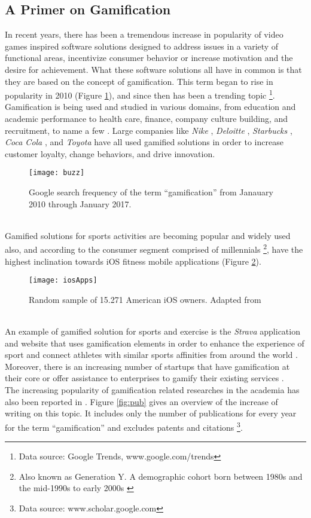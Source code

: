 \subsection{A Primer on Gamification}
In recent years, there has been a tremendous increase in popularity of video games inspired software solutions designed to address issues in a variety of functional areas, incentivize consumer behavior or increase motivation and the desire for achievement. What these software solutions all have in common is that they are based on the concept of gamification. This term began to rise in popularity in 2010 (Figure \ref{fig:buzz}), and since then has been a trending topic \footnote{Data source: Google Trends, www.google.com/trends}. Gamification is being used and studied in various domains, from education and academic performance to health care, finance, company culture building, and recruitment, to name a few \cite{gamificationExamples, gamificationWiki, enterpriseGamify}. Large companies like \textit{Nike} \cite{nikePlus}, \textit{Deloitte} \cite{deloitte}, \textit{Starbucks} \cite{starbucks}, \textit{Coca Cola} \cite{coke}, and \textit{Toyota} \cite{toyota} have all used gamified solutions in order to increase customer loyalty, change behaviors, and drive innovation. \pagebreak 
\begin{figure}[h]
    \centering
    \texttt{[image: buzz]}
    \caption[Search frequency on ``gamification'' ]{Google search frequency of the term ``gamification'' from Janauary 2010 through January 2017.}
    \label{fig:buzz}
\end{figure}\\
Gamified solutions for sports activities are becoming popular and widely used also, and according to \cite{iosPopulatity} the consumer segment comprised of millennials \footnote{Also known as Generation Y. A demographic cohort born between 1980s and the mid-1990s to early 2000s \cite{mill}}, have the highest inclination towards iOS fitness mobile applications (Figure \ref{fig:iosApps}). 
\begin{figure}[h]
    \centering
    \texttt{[image: iosApps]}
    \caption{Random sample of 15.271 American iOS owners. Adapted from \cite{iosPopulatity}}
    \label{fig:iosApps}
\end{figure}\\
An example of gamified solution for sports and exercise is the \textit{Strava} application and website that uses gamification elements in order to enhance the experience of sport and connect athletes with similar sports affinities from around the world \cite{strava}. Moreover, there is an increasing number of startups \cite{foursquare, codeacademy} that have gamification at their core or offer assistance to enterprises to gamify their existing services \cite{badgeville}. \\The increasing popularity of gamification related researches in the academia has also been reported in \cite{hamari2014does}. Figure \ref{fig:pub} gives an overview of the increase of writing on this topic. It includes only the number of publications for every year for the term ``gamification'' and excludes patents and citations \footnote{Data source: www.scholar.google.com}. 
